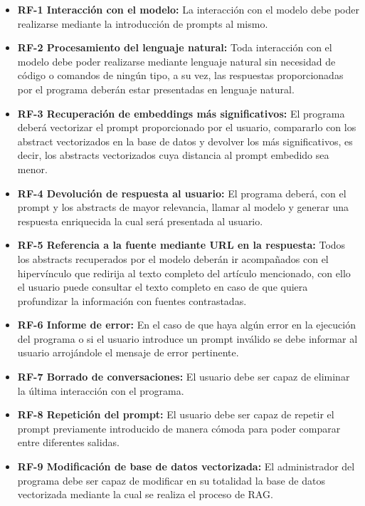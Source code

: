 \begin{itemize}
  \item \textbf{RF-1 Interacción con el modelo:} La interacción con el modelo debe poder realizarse mediante la introducción de prompts al mismo.
  
  \item \textbf{RF-2 Procesamiento del lenguaje natural:} Toda interacción con el modelo debe poder realizarse mediante lenguaje natural sin necesidad de código o comandos de ningún tipo, a su vez, las respuestas proporcionadas por el programa deberán estar presentadas en lenguaje natural.
  
  \item \textbf{RF-3 Recuperación de embeddings más significativos:} El programa deberá vectorizar el prompt proporcionado por el usuario, compararlo con los abstract vectorizados en la base de datos y devolver los más significativos, es decir, los abstracts vectorizados cuya distancia al prompt embedido sea menor.
  
  \item \textbf{RF-4 Devolución de respuesta al usuario:} El programa deberá, con el prompt y los abstracts de mayor relevancia, llamar al modelo y generar una respuesta enriquecida la cual será presentada al usuario.
  
  \item \textbf{RF-5 Referencia a la fuente mediante URL en la respuesta:} Todos los abstracts recuperados por el modelo deberán ir acompañados con el hipervínculo que redirija al texto completo del artículo mencionado, con ello el usuario puede consultar el texto completo en caso de que quiera profundizar la información con fuentes contrastadas.
  
  \item \textbf{RF-6 Informe de error:} En el caso de que haya algún error en la ejecución del programa o si el usuario introduce un prompt inválido se debe informar al usuario arrojándole el mensaje de error pertinente.
  
  \item \textbf{RF-7 Borrado de conversaciones:} El usuario debe ser capaz de eliminar la última interacción con el programa.
  
  \item \textbf{RF-8 Repetición del prompt:} El usuario debe ser capaz de repetir el prompt previamente introducido de manera cómoda para poder comparar entre diferentes salidas.
  
  \item \textbf{RF-9 Modificación de base de datos vectorizada:} El administrador del programa debe ser capaz de modificar en su totalidad la base de datos vectorizada mediante la cual se realiza el proceso de RAG.


\end{itemize}
